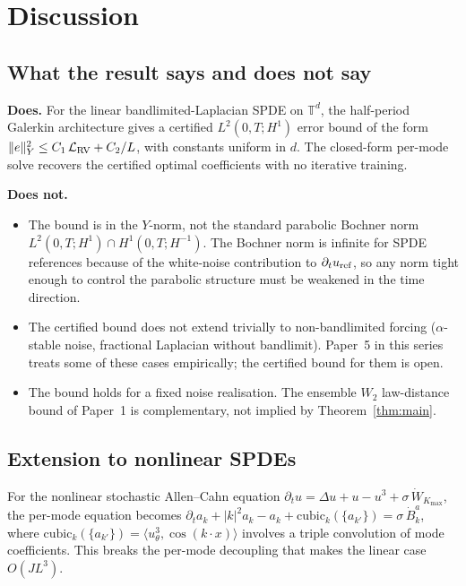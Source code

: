 \section{Discussion}
\label{sec:discussion}

\subsection{What the result says and does not say}
\label{sec:disc:scope}

\textbf{Does.} For the linear bandlimited-Laplacian SPDE on
$\mathbb{T}^d$, the half-period Galerkin architecture gives a
certified $L^2(0, T; H^1)$ error bound of the form
$\|e\|_Y^2 \le C_1\,\mathcal{L}_{\rm RV} + C_2/L$, with constants
uniform in $d$. The closed-form per-mode solve recovers the certified
optimal coefficients with no iterative training.

\textbf{Does not.}
\begin{itemize}
\item The bound is in the $Y$-norm, not the standard parabolic
Bochner norm $L^2(0, T; H^1) \cap H^1(0, T; H^{-1})$. The Bochner
norm is infinite for SPDE references because of the white-noise
contribution to $\partial_t u_{\rm ref}$, so any norm tight enough
to control the parabolic structure must be weakened in the time
direction.
\item The certified bound does not extend trivially to non-bandlimited
forcing ($\alpha$-stable noise, fractional Laplacian without
bandlimit). Paper~5 in this series treats some of these cases
empirically; the certified bound for them is open.
\item The bound holds for a fixed noise realisation. The ensemble
$W_2$ law-distance bound of Paper~1 is complementary, not implied
by Theorem~\ref{thm:main}.
\end{itemize}

\subsection{Extension to nonlinear SPDEs}
\label{sec:disc:nonlinear}

For the nonlinear stochastic Allen--Cahn equation
$\partial_t u = \Delta u + u - u^3 + \sigma\,\dot W_{K_{\max}}$,
the per-mode equation becomes
$\partial_t a_k + |k|^2 a_k - a_k + \mathrm{cubic}_k(\{a_{k'}\}) = \sigma\,\dot B_k^a$,
where $\mathrm{cubic}_k(\{a_{k'}\}) = \langle u_\theta^3, \cos(k \cdot
x)\rangle$ involves a triple convolution of mode coefficients. This
breaks the per-mode decoupling that makes the linear case
$O(JL^3)$.

